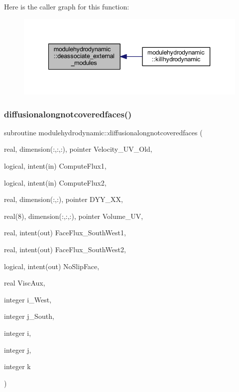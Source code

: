 Here is the caller graph for this function\+:\nopagebreak
\begin{figure}[H]
\begin{center}
\leavevmode
\includegraphics[width=340pt]{namespacemodulehydrodynamic_a9ab4535ec430fb9f040e8027eab7128d_icgraph}
\end{center}
\end{figure}
\mbox{\label{namespacemodulehydrodynamic_ab381daa0e16a21aa8f474a88fc7d11b7}} 
\subsubsection{\texorpdfstring{diffusionalongnotcoveredfaces()}{diffusionalongnotcoveredfaces()}}
{\footnotesize\ttfamily subroutine modulehydrodynamic\+::diffusionalongnotcoveredfaces (\begin{DoxyParamCaption}\item[{real, dimension(\+:,\+:,\+:), pointer}]{Velocity\+\_\+\+U\+V\+\_\+\+Old,  }\item[{logical, intent(in)}]{Compute\+Flux1,  }\item[{logical, intent(in)}]{Compute\+Flux2,  }\item[{real, dimension(\+:,\+:), pointer}]{D\+Y\+Y\+\_\+\+XX,  }\item[{real(8), dimension(\+:,\+:,\+:), pointer}]{Volume\+\_\+\+UV,  }\item[{real, intent(out)}]{Face\+Flux\+\_\+\+South\+West1,  }\item[{real, intent(out)}]{Face\+Flux\+\_\+\+South\+West2,  }\item[{logical, intent(out)}]{No\+Slip\+Face,  }\item[{real}]{Visc\+Aux,  }\item[{integer}]{i\+\_\+\+West,  }\item[{integer}]{j\+\_\+\+South,  }\item[{integer}]{i,  }\item[{integer}]{j,  }\item[{integer}]{k }\end{DoxyParamCaption})\hspace{0.3cm}{\ttfamily [private]}}

